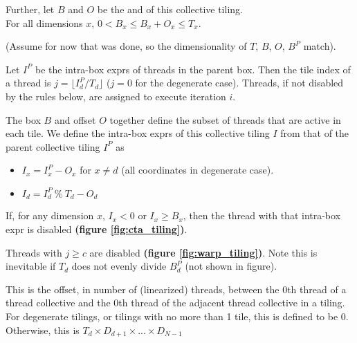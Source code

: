 \filbreak
Further, let $B$ and $O$ be the  and  of this collective tiling.\\
For all dimensions $x$, $0 < B_x \le B_x + O_x \le T_x$.

\filbreak
(Assume for now that  was done, so the dimensionality of $T$, $B$, $O$, $B^P$ match).

\filbreak
{} Let $I^P$ be the intra-box exprs of threads in the parent box.
Then the tile index of a thread is $j = \lfloor I^P_d / T_d \rfloor$ ($j = 0$ for the degenerate case).
Threads, if not disabled by the rules below, are assigned to execute iteration $i$.

\filbreak
{} The box $B$ and offset $O$ together define the subset of threads that are active in each tile.
We define the intra-box exprs of this collective tiling $I$ from that of the parent collective tiling $I^P$ as
\begin{itemize}
  \item $I_x = I^P_x - O_x$ for $x \ne d$ (all coordinates in degenerate case).
  \item $I_d = I^P_d~\%~T_d - O_d$
\end{itemize}
If, for any dimension $x$, $I_x < 0$ or $I_x \ge B_x$, then the thread with that intra-box expr is disabled
\textbf{(figure \ref{fig:cta_tiling})}.

\filbreak
{} Threads with $j \ge c$ are disabled \textbf{(figure \ref{fig:warp_tiling})}.
Note this is inevitable if $T_d$ does not evenly divide $B^P_d$ (not shown in figure).

\filbreak
{} This is the offset, in number of (linearized) threads, between the 0th thread of a thread collective and the 0th thread of the adjacent thread collective in a tiling.
For degenerate tilings, or tilings with no more than 1 tile, this is defined to be 0.
Otherwise, this is $T_d \times D_{d+1} \times ... \times D_{N-1}$

